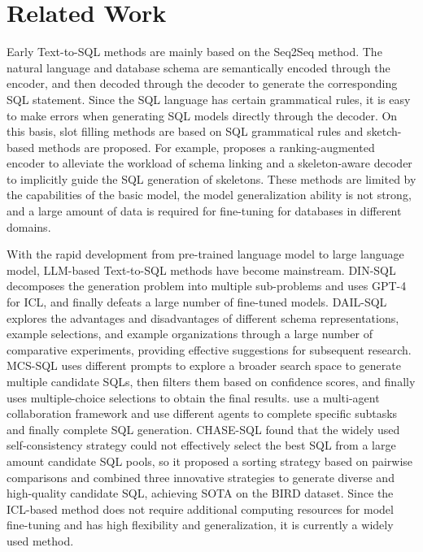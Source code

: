 \section{Related Work}
\label{sec:related_works}
Early Text-to-SQL methods are mainly based on the Seq2Seq method. The natural language and database schema are semantically encoded through the encoder, and then decoded through the decoder to generate the corresponding SQL statement\citep{zhong2017seq2sqlgeneratingstructuredqueries}. Since the SQL language has certain grammatical rules, it is easy to make errors when generating SQL models directly through the decoder. On this basis, slot filling methods are based on SQL grammatical rules \citep{wang-etal-2020-rat, guo-etal-2019-towards, yu-etal-2018-syntaxsqlnet} and sketch-based methods \citep{lyu2020hybridrankingnetworktexttosql, yu-etal-2018-typesql} are proposed. For example, \citep{Li_Zhang_Li_Chen_2023} proposes a ranking-augmented encoder to alleviate the workload of schema linking and a skeleton-aware decoder to implicitly guide the SQL generation of skeletons. These methods are limited by the capabilities of the basic model, the model generalization ability is not strong, and a large amount of data is required for fine-tuning for databases in different domains.

With the rapid development from pre-trained language model to large language model, LLM-based Text-to-SQL methods have become mainstream. DIN-SQL\citep{pourreza_din-sql_2023} decomposes the generation problem into multiple sub-problems  and uses GPT-4 for ICL, and finally defeats a large number of fine-tuned models. DAIL-SQL\citep{gao_text--sql_2023} explores the advantages and disadvantages of different schema representations, example selections, and example organizations through a large number of comparative experiments, providing effective suggestions for subsequent research. MCS-SQL\citep{lee_mcs-sql_2024} uses different prompts to explore a broader search space to generate multiple candidate SQLs, then filters them based on confidence scores, and finally uses multiple-choice selections to obtain the final results. \citep{wang_mac-sql_2024,cen_sqlfixagent_2024} use a multi-agent collaboration framework and use different agents to complete specific subtasks and finally complete SQL generation. CHASE-SQL\citep{pourreza2024chase} found that the widely used self-consistency strategy could not effectively select the best SQL from a large amount candidate SQL pools, so it proposed a sorting strategy based on pairwise comparisons and combined three innovative strategies to generate diverse and high-quality candidate SQL, achieving SOTA on the BIRD dataset. Since the ICL-based method does not require additional computing resources for model fine-tuning and has high flexibility and generalization, it is currently a widely used method.

